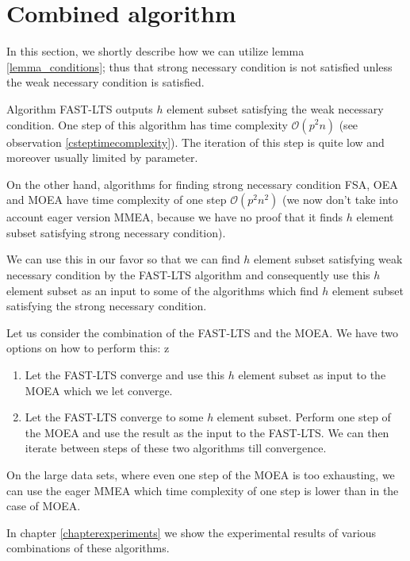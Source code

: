 \section{Combined algorithm} \label{sectioncombined}
In this section, we shortly describe how we can utilize lemma \ref{lemma_conditions}; thus that strong necessary condition is not satisfied unless the weak necessary condition is satisfied.

Algorithm FAST-LTS outputs $h$ element subset satisfying the weak necessary condition. One step of this algorithm has time complexity $\mathcal{O}(p^2n)$ (see observation \ref{csteptimecomplexity}). The iteration of this step is quite low and moreover usually limited by parameter. 

On the other hand, algorithms for finding strong necessary condition FSA, OEA and MOEA have time complexity of one step $\mathcal{O}(p^2n^2)$ (we now don't take into account eager version MMEA, because we have no proof that it finds $h$ element subset satisfying strong necessary condition). 

We can use this in our favor so that we can find $h$ element subset satisfying weak necessary condition by the FAST-LTS algorithm and consequently use this $h$ element subset as an input to some of the algorithms which find $h$ element subset satisfying the strong necessary condition.

Let us consider the combination of the FAST-LTS and the MOEA. We have two options on how to perform this:
z
\begin{enumerate}
    \item Let the FAST-LTS converge and use this $h$ element subset as input to the MOEA which we let converge.
    \item Let the FAST-LTS converge to some $h$ element subset. Perform one step of the MOEA and use the result as the input to the FAST-LTS. We can then iterate between steps of these two algorithms till convergence.
\end{enumerate}

On the large data sets, where even one step of the MOEA is too exhausting, we can use the eager MMEA which time complexity of one step is lower than in the case of MOEA.

In chapter \ref{chapterexperiments} we show the experimental results of various combinations of these algorithms.






